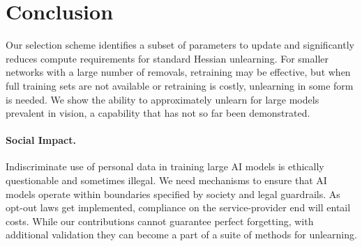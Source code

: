 \section{Conclusion}
Our selection scheme identifies a subset of parameters to update and significantly reduces compute requirements for standard Hessian unlearning. 
For smaller networks with a large number of removals, retraining may be effective, but when full training sets are not available or retraining is costly, unlearning in some form is needed. 
We show the ability to approximately unlearn for large models prevalent in vision, a capability that has not so far been demonstrated.  

\paragraph{Social Impact.} 
Indiscriminate use of personal data in training 
large AI models is ethically questionable 
and sometimes illegal. We need mechanisms to ensure that AI models operate 
within boundaries specified by society 
and legal guardrails. As opt-out laws get 
implemented, compliance on the service-provider end will entail costs. 
While our contributions cannot guarantee perfect forgetting, with additional 
validation they can become a part of a suite of methods for unlearning. 


